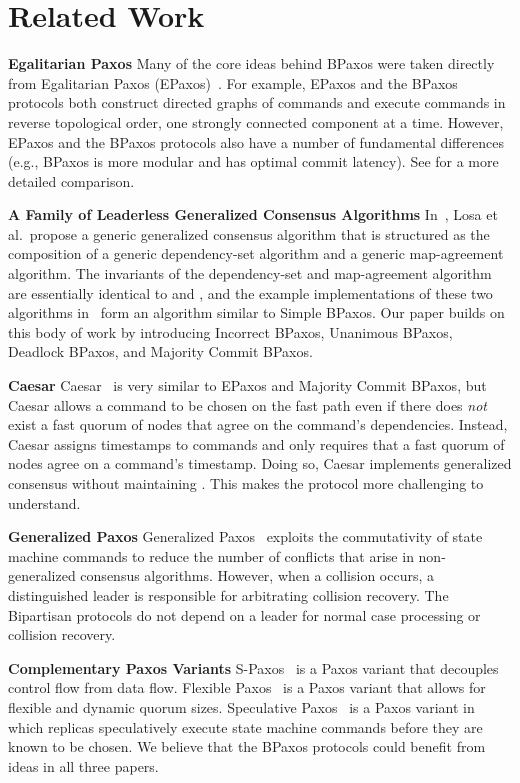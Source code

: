 \section{Related Work}
\newcommand{\condensedparagraph}[1]{\textbf{#1}\;}

\condensedparagraph{Egalitarian Paxos}
Many of the core ideas behind BPaxos were taken directly from Egalitarian Paxos
(EPaxos)~\cite{moraru2013there, moraru2013proof}. For example, EPaxos and the
BPaxos protocols both construct directed graphs of commands and execute
commands in reverse topological order, one strongly connected component at a
time. However, EPaxos and the BPaxos protocols also have a number of
fundamental differences (e.g., BPaxos is more modular and has optimal commit
latency). See  for a more detailed comparison.

\condensedparagraph{A Family of Leaderless Generalized Consensus Algorithms}
In~\cite{losa2016brief}, Losa et al.\ propose a generic generalized consensus
algorithm that is structured as the composition of a generic dependency-set
algorithm and a generic map-agreement algorithm. The invariants of the
dependency-set and map-agreement algorithm are essentially identical to
 and , and the example
implementations of these two algorithms in~\cite{losa2016brief} form an
algorithm similar to Simple BPaxos. Our paper builds on this body of work by
introducing Incorrect BPaxos, Unanimous BPaxos, Deadlock BPaxos, and Majority
Commit BPaxos.

\condensedparagraph{Caesar}
Caesar~\cite{arun2017speeding} is very similar to EPaxos and Majority Commit
BPaxos, but Caesar allows a command to be chosen on the fast path even if there
does \emph{not} exist a fast quorum of nodes that agree on the command's
dependencies. Instead, Caesar assigns timestamps to commands and only requires
that a fast quorum of nodes agree on a command's timestamp. Doing so, Caesar
implements generalized consensus without maintaining
. This makes the protocol more challenging to
understand.

\condensedparagraph{Generalized Paxos}
Generalized Paxos~\cite{lamport2005generalized} exploits the commutativity of
state machine commands to reduce the number of conflicts that arise in
non-generalized consensus algorithms. However, when a collision occurs, a
distinguished leader is responsible for arbitrating collision recovery. The
Bipartisan protocols do not depend on a leader for normal case processing or
collision recovery.

\condensedparagraph{Complementary Paxos Variants}
S-Paxos~\cite{biely2012s} is a Paxos variant that decouples control flow from
data flow. Flexible Paxos~\cite{howard2016flexible} is a Paxos variant that
allows for flexible and dynamic quorum sizes. Speculative
Paxos~\cite{ports2015designing} is a Paxos variant in which replicas
speculatively execute state machine commands before they are known to be
chosen. We believe that the BPaxos protocols could benefit from ideas in all
three papers.
